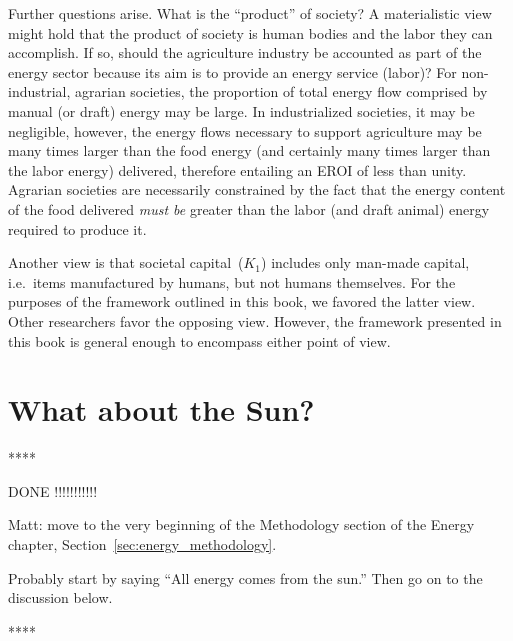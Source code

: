 Further questions arise. 
What is the ``product'' of society? 
A materialistic view might hold that the product of
society is human bodies and the labor they can accomplish. 
If so, 
should the agriculture industry 
be accounted as part of the energy sector 
because its aim is to provide 
an energy service (labor)? 
For non-industrial, agrarian societies, 
the proportion of total energy flow 
comprised by manual (or draft) energy 
may be large. 
In industrialized societies, 
it may be negligible, 
however, 
the energy flows necessary to support agriculture
may be many times larger than the food energy
(and certainly many times larger 
than the labor energy) 
delivered, therefore entailing an EROI of less than unity. 
Agrarian societies are necessarily constrained 
by the fact that the energy content of the food delivered 
\emph{must be} greater than the labor (and draft animal) 
energy required to produce it.

Another view is that societal capital~($K_{1}$) 
includes only man-made capital, 
i.e.\ items manufactured by humans,
but not humans themselves. 
For the purposes of the framework outlined in this book, 
we favored the latter view.
Other researchers favor the opposing view.\cite{Giampietro2013}
However,
the framework presented in this book is general enough to encompass either point of view.


\section{What about the Sun?}
\label{sec:emergy}

****

DONE !!!!!!!!!!!

Matt: move to the very beginning of the Methodology
section of the Energy chapter, Section~\ref{sec:energy_methodology}.

Probably start by saying ``All energy comes from the sun.''
Then go on to the discussion below.

****

